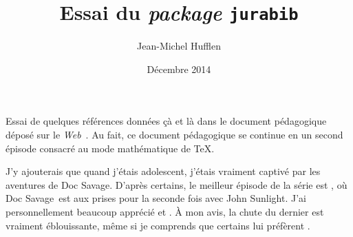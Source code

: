 \documentclass{article}
\title{Essai du \foreignlanguage{english}{\emph{package} \texttt{jurabib}}}
\author{Jean-Michel Hufflen}
\date{Décembre 2014}
\newcommand{\ds}{\foreignlanguage{english}{Doc Savage}}
\newcommand{\web}{\foreignlanguage{english}{\emph{Web}}}
\begin{document}
\maketitle

Essai de quelques références \cite{kurland1977,lint2002} données çà et là dans
le document pédagogique déposé sur le \web\ \cite{h2006}. Au fait, ce document
pédagogique se continue en un second épisode \cite{h2006a} consacré au mode
mathématique de \TeX.

J'y ajouterais que quand j'étais adolescent, j'étais vraiment captivé par les
aventures de \ds. D'après certains, le meilleur épisode de la série est
\foreignlanguage{english}{} \cite{robeson1974c},
où \ds\ est aux prises pour la seconde fois avec \foreignlanguage{english}{John
Sunlight}. J'ai personnellement beaucoup apprécié
\foreignlanguage{english}{} \cite{robeson1968g}
et \foreignlanguage{english}{}
\cite{robeson1968j}. \`{A} mon avis, la chute du dernier \cite{robeson1968j}
est vraiment éblouissante, même si je comprends que certains lui préfèrent
\foreignlanguage{english}{} \cite{robeson1974c}.



\end{document}
